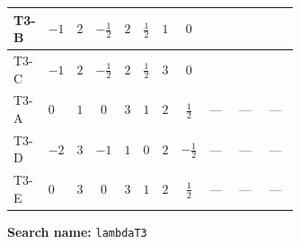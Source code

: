 \documentclass[8pt]{article}
\begin{document}
\begin{landscape}
\begin{longtable}{@{}llcccccc >{\raggedright\arraybackslash}p{0.21\linewidth} >{\raggedright\arraybackslash}p{0.21\linewidth} >{\raggedright\arraybackslash}p{0.21\linewidth}@{}}
T3-B & $-1$ & $2$ & $-\frac{1}{2}$ & $2$ & $\frac{1}{2}$ & $1$ & $0$ & \scriptsize\adjustbox{max width=\linewidth}{$\begin{gathered} {\lambda_{T3}} \left(6 \operatorname{Tr}\!\left({Y_d}\,\left({Y_d}\right)^{\dagger}\right)+2 \operatorname{Tr}\!\left({Y_e}\,\left({Y_e}\right)^{\dagger}\right)+6 \operatorname{Tr}\!\left({Y_u}\,\left({Y_u}\right)^{\dagger}\right)+\frac{{\lambda_{12}^{\rm Adj}}}{6}+\frac{2 {\lambda_{H1}^{\rm Adj}}}{3}+2 {\lambda_{H2}^{\rm Adj}}\right)\end{gathered}$} & \scriptsize\adjustbox{max width=\linewidth}{$\begin{gathered} -4 {\lambda_{H H^\dagger S_1^\dagger S_2^\dagger}^{\rm Cross}} \left({\lambda_{H^\dagger H^\dagger S_1^\dagger S_1^\dagger}}\right)^{*}\end{gathered}$} & \scriptsize\adjustbox{max width=\linewidth}{$\begin{gathered} +4 {\lambda_{S_1 S_1^{\dagger 2}S_2^\dagger}} \left({\lambda_{H^\dagger H^\dagger S_1^\dagger S_1^\dagger}}\right)^{*}\end{gathered}$} \\
\midrule
T3-C & $-1$ & $2$ & $-\frac{1}{2}$ & $2$ & $\frac{1}{2}$ & $3$ & $0$ & \scriptsize\adjustbox{max width=\linewidth}{$\begin{gathered} {\lambda_{T3}} \left(6 \operatorname{Tr}\!\left({Y_d}\,\left({Y_d}\right)^{\dagger}\right)+2 \operatorname{Tr}\!\left({Y_e}\,\left({Y_e}\right)^{\dagger}\right)+6 \operatorname{Tr}\!\left({Y_u}\,\left({Y_u}\right)^{\dagger}\right)+\frac{{\lambda_{12}^{\rm Adj}}}{6}+\frac{2 {\lambda_{H1}^{\rm Adj}}}{3}+2 {\lambda_{H2}^{\rm Adj}}\right)\end{gathered}$} & \scriptsize\adjustbox{max width=\linewidth}{$\begin{gathered} -4 {\lambda_{H H^\dagger S_1^\dagger S_2^\dagger}^{\rm Cross}} \left({\lambda_{H^\dagger H^\dagger S_1^\dagger S_1^\dagger}}\right)^{*}\end{gathered}$} & \scriptsize\adjustbox{max width=\linewidth}{$\begin{gathered} +4 {\lambda_{S_1 S_1^{\dagger 2}S_2^\dagger}} \left({\lambda_{H^\dagger H^\dagger S_1^\dagger S_1^\dagger}}\right)^{*}\end{gathered}$} \\
\midrule
T3-A & $0$ & $1$ & $0$ & $3$ & $1$ & $2$ & $\frac{1}{2}$ & --- & --- & --- \\
\midrule
T3-D & $-2$ & $3$ & $-1$ & $1$ & $0$ & $2$ & $-\frac{1}{2}$ & --- & --- & --- \\
\midrule
T3-E & $0$ & $3$ & $0$ & $3$ & $1$ & $2$ & $\frac{1}{2}$ & --- & --- & --- \\
\midrule
\bottomrule
\end{longtable}
\clearpage
\noindent\textbf{Search name: }\texttt{lambdaT3}\par\smallskip

\end{landscape}
\end{document}
